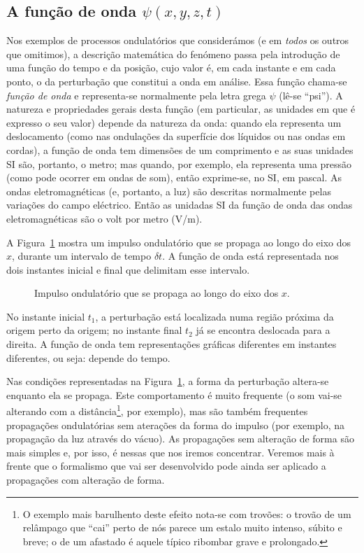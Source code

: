 \subsection{A função de onda $\psi(x,y,z,t)$}
Nos exemplos de processos ondulatórios que considerámos (e em \emph{todos} os
outros que omitimos), a descrição matemática do fenómeno passa pela introdução
de uma função do tempo e da posição, cujo valor é, em cada instante e em cada
ponto, o da perturbação que constitui a onda em análise. Essa função chama-se
\emph{função de onda} e representa-se normalmente pela letra grega $\psi$ (lê-se
``psi''). A natureza e propriedades gerais desta função (em particular, as
unidades em que é expresso o seu valor) depende da natureza da onda: quando ela
representa um deslocamento (como nas ondulações da superfície dos líquidos ou
nas ondas em cordas), a função de onda tem dimensões de um comprimento e as suas
unidades SI são, portanto, o metro; mas quando, por exemplo, ela representa uma
pressão (como pode ocorrer em ondas de som), então exprime-se, no SI, em pascal.
As ondas eletromagnéticas (e, portanto, a luz) são descritas normalmente pelas
variações do campo eléctrico. Então as unidadas SI da função de onda das ondas
eletromagnéticas são o volt por metro (V/m).

A Figura~\ref{fig:01-020} mostra um impulso ondulatório que se propaga ao longo
do eixo dos $x$, durante um intervalo de tempo $\delta t$. A função de onda está
representada nos dois instantes inicial e final que delimitam esse intervalo.
\begin{figure}[htb]
    {\centering
        \par
    }
    \caption{Impulso ondulatório que se propaga ao longo do eixo dos
    $x$.\label{fig:01-020}}
\end{figure}
No instante inicial $t_1$, a perturbação está localizada numa região próxima da
origem perto da origem; no instante final $t_2$ já se encontra deslocada para a
direita. A função de onda tem representações gráficas diferentes em instantes
diferentes, ou seja: depende do tempo.

Nas condições representadas na Figura~\ref{fig:01-020}, a forma da perturbação
altera-se enquanto ela se propaga. Este comportamento é muito frequente (o som
vai-se alterando com a distância\footnote{O exemplo mais barulhento deste efeito
    nota-se com trovões: o trovão de um relâmpago que ``cai'' perto de nós
    parece um estalo muito intenso, súbito e breve; o de um afastado é aquele
típico ribombar grave e prolongado.}, por exemplo), mas são também frequentes
propagações ondulatórias sem aterações da forma do impulso (por exemplo, na
propagação da luz através do vácuo). As propagações sem alteração de forma são
mais simples e, por isso, é nessas que nos iremos concentrar. Veremos mais à
frente que o formalismo que vai ser desenvolvido pode ainda ser aplicado a
propagações com alteração de forma.

